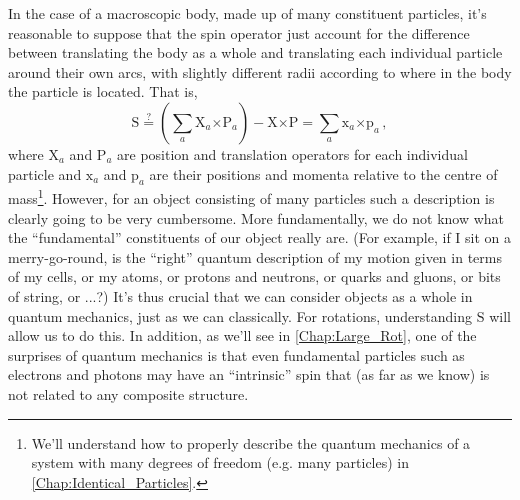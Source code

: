 \documentclass{article}
\theoremstyle{plain}\theoremheaderfont{\normalfont\itshape}\theorembodyfont{\rmfamily}\theoremseparator{.}\newtheorem*{rem}{Remark}\newtheorem*{ex}{Example}\newtheorem*{proof}{Proof}\newtheorem*{altp}{Alternative proof}
\theoremstyle{plain}\theoremheaderfont{\normalfont\bfseries}\theorembodyfont{\rmfamily}\theoremseparator{.}\newtheorem{thm}{Theorem}[section]\newtheorem{lem}[thm]{Lemma}\newtheorem{prop}[thm]{Proposition}\newtheorem*{cor}{Corollary}\newtheorem{defn}[thm]{Definition}\newtheorem{clm}[thm]{Claim}\newtheorem{clminproof}{Claim}
\theoremstyle{break}\theoremheaderfont{\normalfont\itshape}\theorembodyfont{\rmfamily}\theoremseparator{.\medskip}\newtheorem*{proofskip}{Proof}\newtheorem*{exs}{Examples}\newtheorem*{rems}{Remarks}
\theoremstyle{break}\theoremheaderfont{\normalfont\bfseries}\theorembodyfont{\rmfamily}\theoremseparator{.\medskip}\newtheorem{lemskip}[thm]{Lemma}\newtheorem{defnskip}[thm]{Definition}\newtheorem{propskip}[thm]{Proposition}\newtheorem{thmskip}[thm]{Theorem}
\numberwithin{equation}{section}
\newcommand{\vb}[1]{\bm{\mathrm{#1}}}
\newcommand{\cross}{\bm{\times}}
\begin{document}
    In the case of a macroscopic body, made up of many constituent particles, it's reasonable to suppose that the spin operator just account for the difference between translating the body as a whole and translating each individual particle around their own arcs, with slightly different radii according to where in the body the particle is located. That is,
    \begin{equation}
        \vb{S}\stackrel{?}{=}\left(\sum_a\vb{X}_a\cross\vb{P}_a\right)-\vb{X}\cross\vb{P}=\sum_a\vb{x}_a\cross\vb{p}_a\,,
    \end{equation}
    where \(\vb{X}_a\) and \(\vb{P}_a\) are position and translation operators for each individual particle and \(\vb{x}_a\) and \(\vb{p}_a\) are their positions and momenta relative to the centre of mass\footnote{We'll understand how to properly describe the quantum mechanics of a system with many degrees of freedom (e.g. many particles) in \cref{Chap:Identical_Particles}.}. However, for an object consisting of many particles such a description is clearly going to be very cumbersome. More fundamentally, we do not know what the ``fundamental'' constituents of our object really are. (For example, if I sit on a merry-go-round, is the ``right'' quantum description of my motion given in terms of my cells, or my atoms, or protons and neutrons, or quarks and gluons, or bits of string, or ...?) It's thus crucial that we can consider objects as a whole in quantum mechanics, just as we can classically. For rotations, understanding \(\vb{S}\) will allow us to do this. In addition, as we'll see in \cref{Chap:Large_Rot}, one of the surprises of quantum mechanics is that even fundamental particles such as electrons and photons may have an ``intrinsic'' spin that (as far as we know) is not related to any composite structure.
\end{document}
